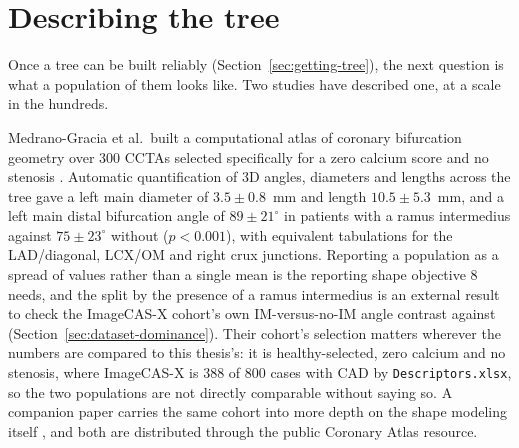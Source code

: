 %

\section{Describing the tree}
\label{sec:describing-tree}

Once a tree can be built reliably (Section~\ref{sec:getting-tree}), the next question is what a
population of them looks like.
Two studies have described one, at a scale in the hundreds.

Medrano-Gracia et al.\ built a computational atlas of coronary bifurcation geometry over 300 CCTAs
selected specifically for a zero calcium score and no stenosis \cite{medranogracia2016atlas}.
Automatic quantification of 3D angles, diameters and lengths across the tree gave a left main
diameter of $3.5 \pm 0.8$~mm and length $10.5 \pm 5.3$~mm, and a left main distal bifurcation angle of
$89 \pm 21^\circ$ in patients with a ramus intermedius against $75 \pm 23^\circ$ without ($p<0.001$),
with equivalent tabulations for the LAD/diagonal, LCX/OM and right crux junctions.
Reporting a population as a spread of values rather than a single mean is the reporting shape
objective 8 needs, and the split by the presence of a ramus intermedius is an external result to
check the ImageCAS-X cohort's own IM-versus-no-IM angle contrast against
(Section~\ref{sec:dataset-dominance}).
Their cohort's selection matters wherever the numbers are compared to this thesis's: it is
healthy-selected, zero calcium and no stenosis, where ImageCAS-X is 388 of 800 cases with CAD by
\texttt{Descriptors.xlsx}, so the two populations are not directly comparable without saying so.
A companion paper carries the same cohort into more depth on the shape modeling itself
\cite{medranogracia2017bifurcation}, and both are distributed through the public Coronary Atlas
resource.


